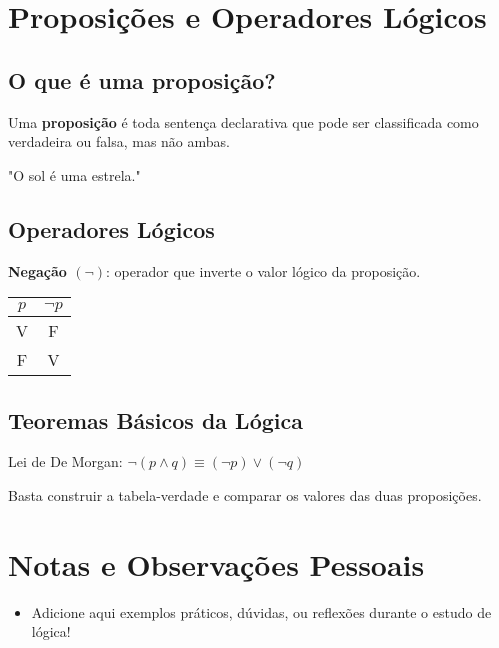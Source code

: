 \section{Proposições e Operadores Lógicos}

\subsection{O que é uma proposição?}
\begin{defbox}
Uma \textbf{proposição} é toda sentença declarativa que pode ser classificada como verdadeira ou falsa, mas não ambas.
\end{defbox}

\begin{examplebox}
"O sol é uma estrela."
\end{examplebox}

\subsection{Operadores Lógicos}
\begin{defbox}
\textbf{Negação $(\neg)$}: operador que inverte o valor lógico da proposição.
\end{defbox}

\begin{ttbox}
\begin{tabular}{c|c}
$p$ & $\neg p$ \\
\hline
V & F \\
F & V \\
\end{tabular}
\end{ttbox}

\subsection{Teoremas Básicos da Lógica}
\begin{theorembox}
Lei de De Morgan: $\neg(p \land q) \equiv (\neg p) \lor (\neg q)$
\end{theorembox}

\begin{proofbox}
Basta construir a tabela-verdade e comparar os valores das duas proposições.
\end{proofbox}

\section{Notas e Observações Pessoais}
\begin{itemize}[leftmargin=1.5em]
    \item Adicione aqui exemplos práticos, dúvidas, ou reflexões durante o estudo de lógica!
\end{itemize}
